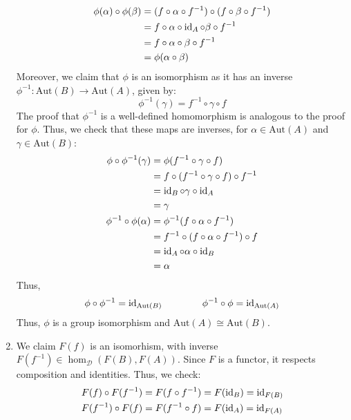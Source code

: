 \documentclass[12pt]{article}
\begin{document}
\begin{solu}
\begin{enumerate}
\begin{align*}
            \phi(\alpha) \circ \phi(\beta) &= (f \circ \alpha \circ f^{-1}) \circ (f \circ \beta \circ f^{-1}) \\
            &= f \circ \alpha \circ \operatorname{id}_A \circ \beta \circ f^{-1} \\
            &= f \circ \alpha \circ \beta \circ f^{-1} \\
            &= \phi(\alpha \circ \beta)
        \end{align*}
        Moreover, we claim that $\phi$ is an isomorphism as it has an inverse $\phi^{-1}: \text{Aut}(B) \to \text{Aut}(A)$, given by: 
        \[ \phi^{-1}(\gamma) = f^{-1} \circ \gamma \circ f \]
        The proof that $\phi^{-1}$ is a well-defined homomorphism is analogous to the proof for $\phi$. Thus, we check that these maps are inverses, for $\alpha \in \text{Aut}(A)$ and $\gamma \in \text{Aut}(B)$:
        \begin{align*}
            \phi \circ \phi^{-1}(\gamma) &= \phi( f^{-1} \circ \gamma \circ f) \\
            &= f \circ (f^{-1} \circ \gamma \circ f) \circ f^{-1} \\
            &= \operatorname{id}_B \circ \gamma \circ \operatorname{id}_A \\
            &= \gamma \\
            \phi^{-1} \circ \phi(\alpha) &= \phi^{-1}(f \circ \alpha \circ f^{-1}) \\
            &= f^{-1} \circ (f \circ \alpha \circ f^{-1}) \circ f \\
            &= \operatorname{id}_A \circ \alpha \circ \operatorname{id}_B \\
            &= \alpha 
        \end{align*}
        Thus, 
        \[ \phi \circ \phi^{-1} = \operatorname{id}_{\text{Aut}(B)} \qquad \qquad \phi^{-1} \circ \phi = \operatorname{id}_{\text{Aut}(A)} \]
        Thus, $\phi$ is a group isomorphism and $\text{Aut}(A) \cong \text{Aut}(B)$.
        \item We claim $F(f)$ is an isomorhism, with inverse $F(f^{-1}) \in \hom_\mathcal{D} (F(B), F(A))$. Since $F$ is a functor, it respects composition and identities. Thus, we check:
        \begin{align*}
            F(f) \circ F(f^{-1}) &= F(f \circ f^{-1}) = F(\operatorname{id}_B) = \operatorname{id}_{F(B)} \\
            F(f^{-1}) \circ F(f) &= F(f^{-1} \circ f) = F(\operatorname{id}_A) = \operatorname{id}_{F(A)}
        \end{align*}
    \end{enumerate}
\end{solu}
\newpage
\end{document}
